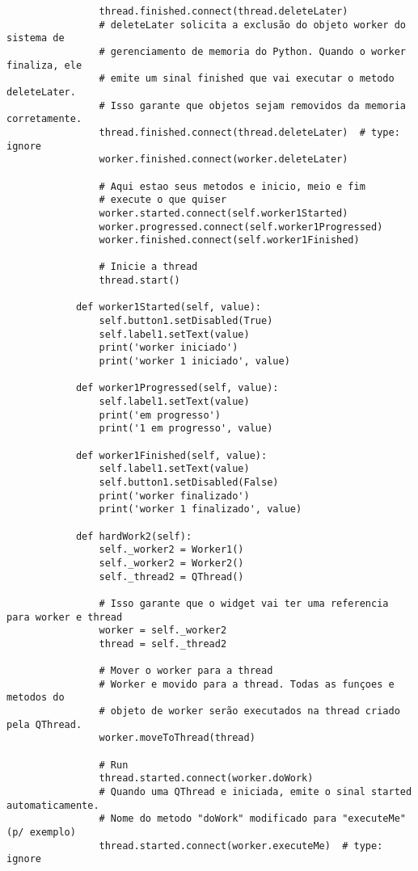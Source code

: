 \documentclass[12pt,a4paper]{article}
\begin{document}
\begin{lstlisting}
                thread.finished.connect(thread.deleteLater)
                # deleteLater solicita a exclusão do objeto worker do sistema de
                # gerenciamento de memoria do Python. Quando o worker finaliza, ele
                # emite um sinal finished que vai executar o metodo deleteLater.
                # Isso garante que objetos sejam removidos da memoria corretamente.
                thread.finished.connect(thread.deleteLater)  # type: ignore
                worker.finished.connect(worker.deleteLater)
        
                # Aqui estao seus metodos e inicio, meio e fim
                # execute o que quiser
                worker.started.connect(self.worker1Started)
                worker.progressed.connect(self.worker1Progressed)
                worker.finished.connect(self.worker1Finished)
        
                # Inicie a thread
                thread.start()
        
            def worker1Started(self, value):
                self.button1.setDisabled(True)
                self.label1.setText(value)
                print('worker iniciado')
                print('worker 1 iniciado', value)
        
            def worker1Progressed(self, value):
                self.label1.setText(value)
                print('em progresso')
                print('1 em progresso', value)
        
            def worker1Finished(self, value):
                self.label1.setText(value)
                self.button1.setDisabled(False)
                print('worker finalizado')
                print('worker 1 finalizado', value)
        
            def hardWork2(self):
                self._worker2 = Worker1()
                self._worker2 = Worker2()
                self._thread2 = QThread()
        
                # Isso garante que o widget vai ter uma referencia para worker e thread
                worker = self._worker2
                thread = self._thread2
        
                # Mover o worker para a thread
                # Worker e movido para a thread. Todas as funçoes e metodos do
                # objeto de worker serão executados na thread criado pela QThread.
                worker.moveToThread(thread)
        
                # Run
                thread.started.connect(worker.doWork)
                # Quando uma QThread e iniciada, emite o sinal started automaticamente.
                # Nome do metodo "doWork" modificado para "executeMe" (p/ exemplo)
                thread.started.connect(worker.executeMe)  # type: ignore
        

\end{lstlisting}
\end{document}

